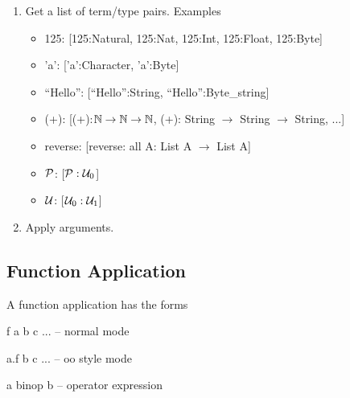\begin{enumerate}

\item Get a list of term/type pairs. Examples
  \begin{itemize}

  \item 125: [125:Natural, 125:Nat, 125:Int, 125:Float, 125:Byte]

  \item 'a': ['a':Character, 'a':Byte]

  \item ``Hello'': [``Hello'':String, ``Hello'':Byte\_string]

  \item (+): [(+):${\mathbb{N}}\to {\mathbb{N}}\to {\mathbb{N}}$, (+): String $\to$ String
    $\to$ String, ...]

  \item reverse: [reverse: all A: List A $\to$ List A]

  \item ${\cal{P}}$: [${\cal{P}}:{\cal{U}}_0$]

  \item ${\cal{U}}$: [${\cal{U}}_0:{\cal{U}}_1$]

  \end{itemize}

\item Apply arguments.
\end{enumerate}



\subsection{Function Application}

A function application has the forms

\begin{alba}
  f a b c ...        -- normal mode

  a.f b c ...        -- oo style mode

  a binop b          -- operator expression
\end{alba}


